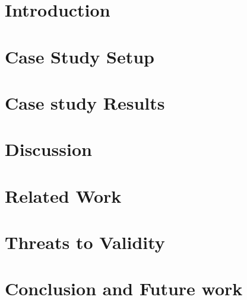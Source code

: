 \documentclass{sig-alternate}
\begin{document}

\terms{}


\section{Introduction}
\label{sec:introduction}


% 

\section{Case Study Setup}
\label{sec:approach}


\section{Case study Results}
\label{sec:case_study_results}


\section{Discussion}
\label{sec:discussion}


\section{Related Work}
\label{sec:related_work}



\section{Threats to Validity}
\label{sec:threats_to_validity}


\section{Conclusion and Future work}
\label{sec:conclusion}



\balance
  
\end{document}
